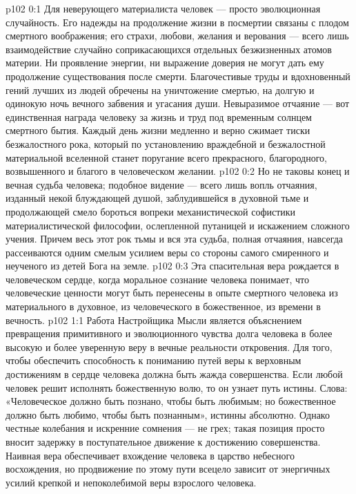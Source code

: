 \author{Мелхиседек}
\vs p102 0:1 Для неверующего материалиста человек --- просто эволюционная случайность. Его надежды на продолжение жизни в посмертии связаны с плодом смертного воображения; его страхи, любови, желания и верования --- всего лишь взаимодействие случайно соприкасающихся отдельных безжизненных атомов материи. Ни проявление энергии, ни выражение доверия не могут дать ему продолжение существования после смерти. Благочестивые труды и вдохновенный гений лучших из людей обречены на уничтожение смертью, на долгую и одинокую ночь вечного забвения и угасания души. Невыразимое отчаяние --- вот единственная награда человеку за жизнь и труд под временным солнцем смертного бытия. Каждый день жизни медленно и верно сжимает тиски безжалостного рока, который по установлению враждебной и безжалостной материальной вселенной станет поругание всего прекрасного, благородного, возвышенного и благого в человеческом желании.
\vs p102 0:2 Но не таковы конец и вечная судьба человека; подобное видение --- всего лишь вопль отчаяния, изданный некой блуждающей душой, заблудившейся в духовной тьме и продолжающей смело бороться вопреки механистической софистики материалистической философии, ослепленной путаницей и искажением сложного учения. Причем весь этот рок тьмы и вся эта судьба, полная отчаяния, навсегда рассеиваются одним смелым усилием веры со стороны самого смиренного и неученого из детей Бога на земле.
\vs p102 0:3 Эта спасительная вера рождается в человеческом сердце, когда моральное сознание человека понимает, что человеческие ценности могут быть перенесены в опыте смертного человека из материального в духовное, из человеческого в божественное, из времени в вечность.
\vs p102 1:1 Работа Настройщика Мысли является объяснением превращения примитивного и эволюционного чувства долга человека в более высокую и более уверенную веру в вечные реальности откровения. Для того, чтобы обеспечить способность к пониманию путей веры к верховным достижениям в сердце человека должна быть жажда совершенства. Если любой человек решит исполнять божественную волю, то он узнает путь истины. Слова: «Человеческое должно быть познано, чтобы быть любимым; но божественное должно быть любимо, чтобы быть познанным», истинны абсолютно. Однако честные колебания и искренние сомнения --- не грех; такая позиция просто вносит задержку в поступательное движение к достижению совершенства. Наивная вера обеспечивает вхождение человека в царство небесного восхождения, но продвижение по этому пути всецело зависит от энергичных усилий крепкой и непоколебимой веры взрослого человека.
